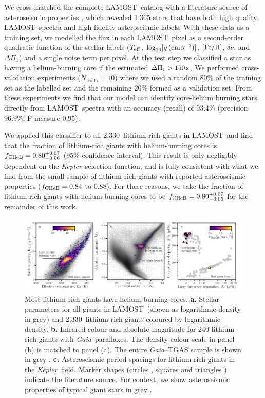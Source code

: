 \documentclass[twocolumn]{aastex62}
\newcommand{\SampleSize}{2,330}
\newcommand\lamost{LAMOST}
\newcommand{\project}[1]{\emph{#1}}
\newcommand{\gaia}{\project{Gaia}}
\newcommand{\kepler}{\project{Kepler}}
\newcommand{\logg}{\log_{10}[g\,({\rm cm\,s}^{-2})]}
\begin{document}
We cross-matched the complete \lamost\ catalog with a literature source of asteroseismic
properties \citep[$\Delta\nu$, $\Delta\Pi_1$;][]{Vrard_2016}, which revealed 1,365 stars that 
have both high quality \lamost\ spectra and high fidelity asteroseismic labels. With these 
data as a training set, we modelled the flux in each \lamost\ pixel as a second-order quadratic function
of the stellar labels ($T_{\rm eff}$, $\logg$, $[{\rm Fe}/{\rm H}]$, $\delta\nu$, and $\Delta\Pi_1$)
and a single noise term per pixel. At the test step we classified a star as having a helium-burning core if 
the estimated $\Delta\Pi_1 > 150\,{\rm s}$. We performed cross-validation experiments ($N_\textrm{trials} = 10$) 
where we used a random 80\% of the training set as the labelled set and the remaining 20\% formed as a validation 
set. From these experiments we find that our model can identify core-helium burning stars directly
from \lamost\ spectra with an accuracy (recall) of 93.4\% (precision 96.9\%; F-measure 0.95). 

We applied this classifier to all \SampleSize\ lithium-rich giants in \lamost\ and find that the
fraction of lithium-rich giants with helium-burning cores is $f_{\rm CHeB} = 0.80^{+0.07}_{-0.06}$ 
(95\% confidence interval). This result is only negligibly dependent on the \kepler\ selection function, and is fully consistent with what we find from the small sample of lithium-rich giants 
with reported asteroseismic properties ($f_{\rm CHeB} = 0.84$ to $0.88$). For these reasons, 
we take the fraction of lithium-rich giants with helium-burning cores to be 
$f_{\rm CHeB} = 0.80^{+0.07}_{-0.06}$ for the remainder of this work.


\begin{figure}
	\includegraphics[width=\textwidth]{figure1}
	\caption{
		{Most lithium-rich giants have helium-burning cores.}
		\textbf{a.} Stellar parameters for all giants in \lamost\ (shown as logarithmic density in grey) and \SampleSize\ lithium-rich giants coloured by logarithmic density.
		\textbf{b.} Infrared colour and absolute magnitude for 240 lithium-rich giants
		with \gaia\ parallaxes. The density colour scale in panel (b) is matched to panel (a).
		The entire \gaia--TGAS sample is shown in grey \citep{Gaia-Collaboration_2018,Anderson_2018}.
		\textbf{c.} Asteroseismic period spacings for lithium-rich giants in the
		\kepler\ field.  Marker shapes (circles \citep{Mosser_2012}, squares \citep{Stello_2013} and triangles \citep{Vrard_2016}) indicate the literature source. For context, we show 
		asteroseismic properties of typical giant stars in grey \citep{Mosser_2012}.}
	\label{fig:figure1}
\end{figure}
\end{document}
